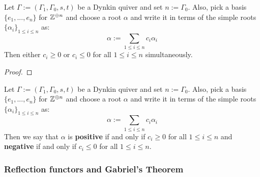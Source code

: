             \begin{lemma} \label{lemma: roots_are_exclusively_either_negative_or_positive}
                Let $\Gamma := (\Gamma_1, \Gamma_0, s, t)$ be a Dynkin quiver and set $n := \Gamma_0$. Also, pick a basis $\{e_1, ..., e_n\}$ for $\mathbb{Z}^{\oplus n}$ and choose a root $\alpha$ and write it in terms of the simple roots $\{\alpha_i\}_{1 \leq i \leq n}$ as:
                    $$\alpha := \sum_{1 \leq i \leq n} c_i \alpha_i$$
                Then either $c_i \geq 0$ or $c_i \leq 0$ for all $1 \leq i \leq n$ simultaneously.
            \end{lemma}
                \begin{proof}
                    
                \end{proof}
            \begin{definition} \label{def: negative_and_positive_roots}
                Let $\Gamma := (\Gamma_1, \Gamma_0, s, t)$ be a Dynkin quiver and set $n := \Gamma_0$. Also, pick a basis $\{e_1, ..., e_n\}$ for $\mathbb{Z}^{\oplus n}$ and choose a root $\alpha$ and write it in terms of the simple roots $\{\alpha_i\}_{1 \leq i \leq n}$ as:
                    $$\alpha := \sum_{1 \leq i \leq n} c_i \alpha_i$$
                Then we say that $\alpha$ is \textbf{positive} if and only if $c_i \geq 0$ for all $1 \leq i \leq n$ and \textbf{negative} if and only if $c_i \leq 0$ for all $1 \leq i \leq n$.
            \end{definition}
            \begin{example}
                
            \end{example}
            
        \subsubsection{Reflection functors and Gabriel's Theorem}
